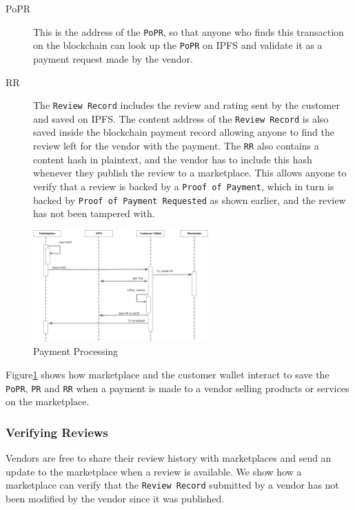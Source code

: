 \documentclass[a4paper]{article}
\begin{document}
\begin{description}
\item[PoPR] This is the address of the \texttt{PoPR}, so that anyone who finds
  this transaction on the blockchain can look up the \texttt{PoPR} on
  IPFS and validate it as a payment request made by the vendor.
\item[RR] The \texttt{Review Record} includes the review and rating
  sent by the customer and saved on IPFS. The content address of the
  \texttt{Review Record} is also saved inside the blockchain payment
  record allowing anyone to find the review left for the vendor with
  the payment. The \texttt{RR} also contains a content hash in
  plaintext, and the vendor has to include this hash whenever they
  publish the review to a marketplace. This allows anyone to verify
  that a review is backed by a \texttt{Proof of Payment}, which in
  turn is backed by \texttt{Proof of Payment Requested} as shown
  earlier, and the review has not been tampered with.
\end{description}

\begin{figure}
\centering
\includegraphics[width=0.6\textwidth]{../payment-processing.eps}
\caption{\label{fig:payment-processing}{Payment Processing}}
\end{figure}

Figure\ref{fig:payment-processing} shows how marketplace and the
customer wallet interact to save the \texttt{PoPR}, \texttt{PR} and
\texttt{RR} when a payment is made to a vendor selling products or
services on the marketplace.


\subsubsection{Verifying Reviews}

Vendors are free to share their review history with marketplaces and
send an update to the marketplace when a review is available. We show
how a marketplace can verify that the \texttt{Review Record} submitted
by a vendor has not been modified by the vendor since it was
published.
\end{document}
